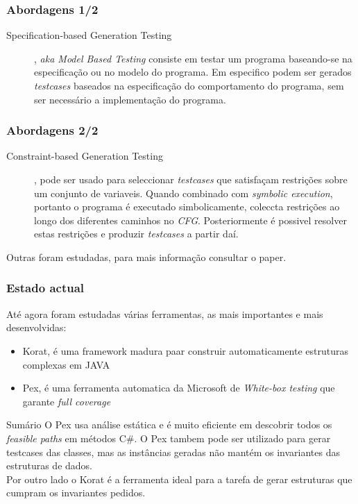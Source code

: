 \documentclass{beamer}
\begin{document}
\begin{frame}\frametitle{Abordagens 1/2}
\begin{description}
\item[Specification-based Generation Testing], \textit{aka Model Based Testing} consiste em testar um programa baseando-se na especificação ou no modelo do programa.
Em especifico podem ser gerados \textit{testcases} baseados na especificação do comportamento do programa, sem ser necessário a implementação do programa.
\end{description}
\end{frame}

\begin{frame}\frametitle{Abordagens 2/2}
\begin{description}
\item[Constraint-based Generation Testing], pode ser usado para seleccionar \textit{testcases} que satisfaçam restrições sobre um conjunto de variaveis.
Quando combinado com \textit{symbolic execution}, portanto o programa é executado simbolicamente, coleccta restrições ao longo dos diferentes caminhos no \textit{CFG}.
Posteriormente é possivel resolver estas restrições e produzir \textit{testcases} a partir daí.
\end{description}
Outras foram estudadas, para mais informação consultar o paper.
\end{frame}

\begin{frame}\frametitle{Estado actual}
Até agora foram estudadas várias ferramentas, as mais importantes e mais desenvolvidas:
\begin{itemize}
\item Korat, é uma framework madura paar construir automaticamente estruturas complexas em JAVA
\item Pex, é uma ferramenta automatica da Microsoft de \textit{White-box testing} que garante \textit{full coverage}
\end{itemize}

\begin{block}{Sumário}
O Pex usa análise estática e é muito eficiente em descobrir todos os \textit{feasible paths} em métodos C\#.
O Pex tambem pode ser utilizado para gerar testcases das classes, mas as instâncias geradas não mantém os invariantes das estruturas de dados.\\

Por outro lado o Korat é a ferramenta ideal para a tarefa de gerar estruturas que cumpram os invariantes pedidos.
\end{block}
\end{frame}
\end{document}
